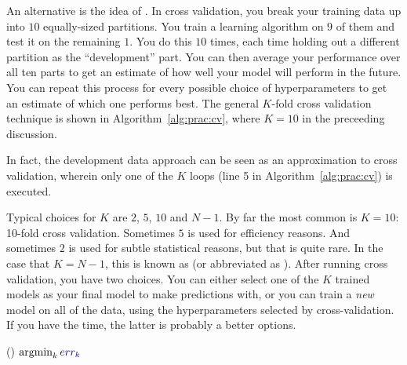 An alternative is the idea of .  In cross
validation, you break your training data up into $10$ equally-sized
partitions.  You train a learning algorithm on $9$ of them and test it
on the remaining $1$.  You do this $10$ times, each time holding out a
different partition as the ``development'' part.  You can then average
your performance over all ten parts to get an estimate of how well
your model will perform in the future.  You can repeat this process
for every possible choice of hyperparameters to get an estimate of
which one performs best.  The general $K$-fold cross validation
technique is shown in Algorithm~\ref{alg:prac:cv}, where $K=10$ in the
preceeding discussion.

In fact, the development data approach can be seen as an approximation
to cross validation, wherein only one of the $K$ loops (line 5 in
Algorithm~\ref{alg:prac:cv}) is executed.

Typical choices for $K$ are $2$, $5$, $10$ and $N-1$.  By far the most
common is $K=10$: 10-fold cross validation.  Sometimes $5$ is used for
efficiency reasons.  And sometimes $2$ is used for subtle statistical
reasons, but that is quite rare.  In the case that $K=N-1$, this is
known as  (or abbreviated as
).  After running cross validation, you
have two choices.  You can either select one of the $K$ trained models
as your final model to make predictions with, or you can train a
\emph{new} model on all of the data, using the hyperparameters
selected by cross-validation.  If you have the time, the latter is
probably a better options.

%
  {()}
  {
\ENDIF
\ENDFOR
\ENDFOR
\RETURN $\argmin_k \VARm{err_k}$
}

